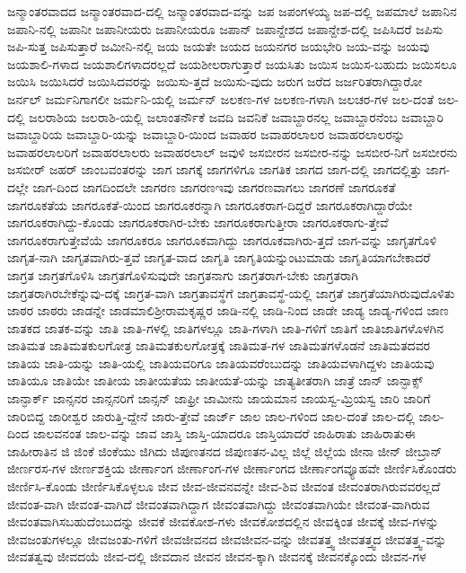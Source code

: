 {ಜನ್ಮಾಂತರವಾದದ
ಜನ್ಮಾಂತರವಾದ-ದಲ್ಲಿ
ಜನ್ಮಾಂತರವಾದ-ವನ್ನು
ಜಪ
ಜಪಂಗಳಯ್ಯ
ಜಪ-ದಲ್ಲಿ
ಜಪಮಾಲೆ
ಜಪಾನಿನ
ಜಪಾನಿ-ನಲ್ಲಿ
ಜಪಾನೀ
ಜಪಾನೀಯರು
ಜಪಾನೀಯರೂ
ಜಪಾನ್
ಜಪಾನ್ದೇಶದ
ಜಪಾನ್ದೇಶ-ದಲ್ಲಿ
ಜಪಿಸಿದರೆ
ಜಪಿಸು
ಜಪಿ-ಸುತ್ತ
ಜಪಿಸುತ್ತಾರೆ
ಜಮೀನಿ-ನಲ್ಲಿ
ಜಯ
ಜಯತೇ
ಜಯದ
ಜಯನಗರ
ಜಯಭೇರಿ
ಜಯ-ವನ್ನು
ಜಯವು
ಜಯಶಾಲಿ-ಗಳಾದ
ಜಯಶಾಲಿಗಳಾದರಲ್ಲದೆ
ಜಯಶೀಲರಾಗುತ್ತಾರೆ
ಜಯಸಿತು
ಜಯಿಸ
ಜಯಿಸ-ಬಹುದು
ಜಯಿಸಲೂ
ಜಯಿಸಿ
ಜಯಿಸಿದರೆ
ಜಯಿಸಿದವರನ್ನು
ಜಯಿಸು-ತ್ತದೆ
ಜಯಿಸು-ವುದು
ಜರುಗ
ಜರೆದ
ಜರ್ಜರಿತರಾಗಿದ್ದಾರೋ
ಜರ್ನಲ್
ಜರ್ಮನಿಗಾಗಲೀ
ಜರ್ಮನಿ-ಯಲ್ಲಿ
ಜರ್ಮನ್
ಜಲಕಣ-ಗಳ
ಜಲಕಣ-ಗಳಾಗಿ
ಜಲಚರ-ಗಳ
ಜಲ-ದಂತೆ
ಜಲ-ದಲ್ಲಿ
ಜಲರಾಶಿಯ
ಜಲರಾಶಿ-ಯಲ್ಲಿ
ಜಲಾಂತರ್ನೌಕೆ
ಜವದಿ
ಜವನಿಕೆ
ಜವಾಬ್ದಾರನಲ್ಲ
ಜವಾಬ್ದಾರನೆಂಬ
ಜವಾಬ್ದಾರಿ
ಜವಾಬ್ದಾರಿಯ
ಜವಾಬ್ದಾರಿ-ಯನ್ನು
ಜವಾಬ್ದಾರಿ-ಯಿಂದ
ಜವಾಹರ
ಜವಾಹರಲಾಲರ
ಜವಾಹರಲಾಲರನ್ನು
ಜವಾಹರಲಾಲರಿಗೆ
ಜವಾಹರಲಾಲರು
ಜವಾಹರಲಾಲ್
ಜವುಳಿ
ಜಸಬೀರನ
ಜಸಬೀರ-ನನ್ನು
ಜಸಬೀರ-ನಿಗೆ
ಜಸಬೀರನು
ಜಸಬೀರ್
ಜಹರ್
ಜಾಂಬವಂತರನ್ನು
ಜಾಗ
ಜಾಗಕ್ಕೆ
ಜಾಗಗಳಿಗೂ
ಜಾಗತಿಕ
ಜಾಗದ
ಜಾಗ-ದಲ್ಲಿ
ಜಾಗದಲ್ಲಿತ್ತು
ಜಾಗ-ದಲ್ಲೇ
ಜಾಗ-ದಿಂದ
ಜಾಗದಿಂದಲೇ
ಜಾಗರಣ
ಜಾಗರಣಇವು
ಜಾಗರಣವಾಗಲು
ಜಾಗರಣೆ
ಜಾಗರೂಕತೆ
ಜಾಗರೂಕತೆಯ
ಜಾಗರೂಕತೆ-ಯಿಂದ
ಜಾಗರೂಕರನ್ನಾಗಿ
ಜಾಗರೂಕರಾಗ-ದಿದ್ದರೆ
ಜಾಗರೂಕರಾಗಿದ್ದಾರೆಯೇ
ಜಾಗರೂಕರಾಗಿದ್ದು-ಕೊಂಡು
ಜಾಗರೂಕರಾಗಿರ-ಬೇಕು
ಜಾಗರೂಕರಾಗುತ್ತೀರಾ
ಜಾಗರೂಕರಾಗು-ತ್ತೇವೆ
ಜಾಗರೂಕರಾಗುತ್ತೇವೆಯೆ
ಜಾಗರೂಕರೂ
ಜಾಗರೂಕವಾಗಿದ್ದು
ಜಾಗರೂಕವಾಗಿರು-ತ್ತದೆ
ಜಾಗ-ವನ್ನು
ಜಾಗೃತಗೊಳಿ
ಜಾಗೃತ-ನಾಗಿ
ಜಾಗೃತವಾಗಿರು-ತ್ತವೆ
ಜಾಗೃತ-ವಾದ
ಜಾಗೃತಿ
ಜಾಗೃತಿಯನ್ನುಂಟುಮಾಡು
ಜಾಗೃತಿಯಾಗಬೇಕಾದರೆ
ಜಾಗ್ರತ
ಜಾಗ್ರತಗೊಳಿಸಿ
ಜಾಗ್ರತಗೊಳಿಸುವುದೇ
ಜಾಗ್ರತನಾಗು
ಜಾಗ್ರತರಾಗ-ಬೇಕು
ಜಾಗ್ರತರಾಗಿ
ಜಾಗ್ರತರಾಗಿರಬೇಕೆನ್ನುವು-ದಕ್ಕೆ
ಜಾಗ್ರತ-ವಾಗಿ
ಜಾಗ್ರತಾವಸ್ಥೆಗೆ
ಜಾಗ್ರತಾವಸ್ಥೆ-ಯಲ್ಲಿ
ಜಾಗ್ರತೆ
ಜಾಗ್ರತೆಯಾಗಿರುವುದೊಳಿತು
ಜಾಠರ
ಜಾಠರು
ಜಾಡನ್ನೇ
ಜಾಡಮಾಲಿಶ್ರೀರಾಮಕೃಷ್ಣರ
ಜಾಡಿ-ನಲ್ಲಿ
ಜಾಡಿ-ನಿಂದ
ಜಾಡೇ
ಜಾಡ್ಯ
ಜಾಡ್ಯ-ಗಳಿಂದ
ಜಾಣ
ಜಾತಕದ
ಜಾತಕ-ವನ್ನು
ಜಾತಿ
ಜಾತಿ-ಗಳಲ್ಲಿ
ಜಾತಿಗಳಲ್ಲೂ
ಜಾತಿ-ಗಳಾಗಿ
ಜಾತಿ-ಗಳಿಗೆ
ಜಾತಿಗೆ
ಜಾತಿಜಾತಿಗಳೊಳಗಿನ
ಜಾತಿಮತ
ಜಾತಿಮತಕುಲಗೋತ್ರ
ಜಾತಿಮತಕುಲಗೋತ್ರಕ್ಕೆ
ಜಾತಿಮತ-ಗಳ
ಜಾತಿಮತಗಳೊಡನೆ
ಜಾತಿಮತದವರ
ಜಾತಿಯ
ಜಾತಿ-ಯನ್ನು
ಜಾತಿ-ಯಲ್ಲಿ
ಜಾತಿಯವರಿಗೂ
ಜಾತಿಯವರೆಂಬುದನ್ನು
ಜಾತಿಯವಳಾಗಿದ್ದಳು
ಜಾತಿಯವು
ಜಾತಿಯೂ
ಜಾತಿಯೇ
ಜಾತೀಯ
ಜಾತೀಯತೆಯ
ಜಾತೀಯತೆ-ಯನ್ನು
ಜಾತ್ಯತೀತರಾಗಿ
ಜಾತ್ರೆ
ಜಾನ್
ಜಾನ್ಫಾಕ್ಸ್
ಜಾನ್ಫಾರ್ಕ್
ಜಾನ್ಸನರ
ಜಾನ್ಸನರಿಗೆ
ಜಾನ್ಸನ್
ಜಾಫ್ರೀ
ಜಾಮೀನು
ಜಾಯಮಾನ
ಜಾಯಸ್ವ-ಮ್ರಿಯಸ್ವ
ಜಾರಿ
ಜಾರಿಗೆ
ಜಾರಿಬಿದ್ದ
ಜಾರೀಶ್ವರ
ಜಾರುತ್ತಿ-ದ್ದೇನೆ
ಜಾರು-ತ್ತೇವೆ
ಜಾರ್ಜ್
ಜಾಲ
ಜಾಲ-ಗಳಿಂದ
ಜಾಲ-ದಂತೆ
ಜಾಲ-ದಲ್ಲಿ
ಜಾಲ-ದಿಂದ
ಜಾಲವನಂತ
ಜಾಲ-ವನ್ನು
ಜಾವ
ಜಾಸ್ತಿ
ಜಾಸ್ತಿ-ಯಾದರೂ
ಜಾಸ್ತಿಯಾದರೆ
ಜಾಹಿರಾತು
ಜಾಹಿರಾತುಈ
ಜಾಹೀರಾತಿನ
ಜಿ
ಜಿಂಕೆ
ಜಿಂಕೆಯು
ಜಿಗಿದು
ಜಿಪುಣತನದ
ಜಿಪುಣತನ-ವಿಲ್ಲ
ಜಿಲ್ಲೆ
ಜಿಲ್ಲೆಯ
ಜೀನಾ
ಜೀನ್
ಜೀಬ್ರಾನ್
ಜೀರ್ಣರಸ-ಗಳ
ಜೀರ್ಣಶಕ್ತಿಯ
ಜೀರ್ಣಾಂಗ
ಜೀರ್ಣಾಂಗ-ಗಳ
ಜೀರ್ಣಾಂಗದ
ಜೀರ್ಣಾಂಗವ್ಯೂಹವೇ
ಜೀರ್ಣಿಸಿಕೊಂಡರು
ಜೀರ್ಣಿಸಿ-ಕೊಂಡು
ಜೀರ್ಣಿಸಿಕೊಳ್ಳಲೂ
ಜೀವ
ಜೀವ-ಜೀವನವನ್ನೇ
ಜೀವ-ಶಿವ
ಜೀವಂತ
ಜೀವಂತರಾಗಿರುವವರಲ್ಲದೆ
ಜೀವಂತ-ವಾಗಿ
ಜೀವಂತ-ವಾಗಿದೆ
ಜೀವಂತವಾಗಿದ್ದಾಗ
ಜೀವಂತವಾಗಿದ್ದು
ಜೀವಂತವಾಗಿಯೇ
ಜೀವಂತ-ವಾಗಿರುವ
ಜೀವಂತವಾಗಿಸಬಹುದೆಂಬುದನ್ನು
ಜೀವಕೆ
ಜೀವಕೋಶ-ಗಳು
ಜೀವಕೋಶದಲ್ಲಿನ
ಜೀವಕ್ಕಿಂತ
ಜೀವಕ್ಕೆ
ಜೀವ-ಗಳನ್ನು
ಜೀವಜಂತುಗಳಲ್ಲೂ
ಜೀವಜಂತು-ಗಳಿಗೆ
ಜೀವಜೀವನದ
ಜೀವಜೀವನ-ವನ್ನು
ಜೀವತತ್ತ್ವ
ಜೀವತತ್ತ್ವದ
ಜೀವತತ್ತ್ವ-ವನ್ನು
ಜೀವತತ್ವವು
ಜೀವದಯೆ
ಜೀವ-ದಲ್ಲಿ
ಜೀವದಾನ
ಜೀವನ
ಜೀವನ-ಕ್ಕಾಗಿ
ಜೀವನಕ್ಕೆ
ಜೀವನಕ್ಕೊಂದು
ಜೀವನ-ಗಳ
}
